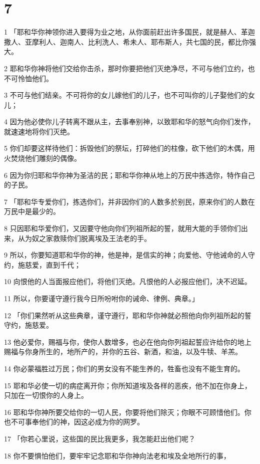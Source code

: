 \chapter{7}

\par 1 「耶和华你神领你进入要得为业之地，从你面前赶出许多国民，就是赫人、革迦撒人、亚摩利人、迦南人、比利洗人、希未人、耶布斯人，共七国的民，都比你强大。
\par 2 耶和华你神将他们交给你击杀，那时你要把他们灭绝净尽，不可与他们立约，也不可怜恤他们。
\par 3 不可与他们结亲。不可将你的女儿嫁他们的儿子，也不可叫你的儿子娶他们的女儿；
\par 4 因为他必使你儿子转离不跟从主，去事奉别神，以致耶和华的怒气向你们发作，就速速地将你们灭绝。
\par 5 你们却要这样待他们：拆毁他们的祭坛，打碎他们的柱像，砍下他们的木偶，用火焚烧他们雕刻的偶像。
\par 6 因为你归耶和华你神为圣洁的民；耶和华你神从地上的万民中拣选你，特作自己的子民。
\par 7 「耶和华专爱你们，拣选你们，并非因你们的人数多於别民，原来你们的人数在万民中是最少的。
\par 8 只因耶和华爱你们，又因要守他向你们列祖所起的誓，就用大能的手领你们出来，从为奴之家救赎你们脱离埃及王法老的手。
\par 9 所以，你要知道耶和华你的神，他是神，是信实的神；向爱他、守他诫命的人守约，施慈爱，直到千代；
\par 10 向恨他的人当面报应他们，将他们灭绝。凡恨他的人必报应他们，决不迟延。
\par 11 所以，你要谨守遵行我今日所吩咐你的诫命、律例、典章。」
\par 12 「你们果然听从这些典章，谨守遵行，耶和华你神就必照他向你列祖所起的誓守约，施慈爱。
\par 13 他必爱你，赐福与你，使你人数增多，也必在他向你列祖起誓应许给你的地上赐福与你身所生的，地所产的，并你的五谷、新酒，和油，以及牛犊、羊羔。
\par 14 你必蒙福胜过万民；你们的男女没有不能生养的，牲畜也没有不能生育的。
\par 15 耶和华必使一切的病症离开你；你所知道埃及各样的恶疾，他不加在你身上，只加在一切恨你的人身上。
\par 16 耶和华你神所要交给你的一切人民，你要将他们除灭；你眼不可顾惜他们。你也不可事奉他们的神，因这必成为你的网罗。
\par 17 「你若心里说，这些国的民比我更多，我怎能赶出他们呢？
\par 18 你不要惧怕他们，要牢牢记念耶和华你神向法老和埃及全地所行的事，
